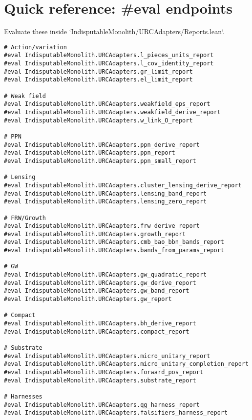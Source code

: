 \documentclass[11pt]{article}
\begin{document}
\section{Quick reference: \#eval endpoints}
Evaluate these inside `IndisputableMonolith/URCAdapters/Reports.lean`.
\begin{verbatim}
# Action/variation
#eval IndisputableMonolith.URCAdapters.l_pieces_units_report
#eval IndisputableMonolith.URCAdapters.l_cov_identity_report
#eval IndisputableMonolith.URCAdapters.gr_limit_report
#eval IndisputableMonolith.URCAdapters.el_limit_report

# Weak field
#eval IndisputableMonolith.URCAdapters.weakfield_eps_report
#eval IndisputableMonolith.URCAdapters.weakfield_derive_report
#eval IndisputableMonolith.URCAdapters.w_link_O_report

# PPN
#eval IndisputableMonolith.URCAdapters.ppn_derive_report
#eval IndisputableMonolith.URCAdapters.ppn_report
#eval IndisputableMonolith.URCAdapters.ppn_small_report

# Lensing
#eval IndisputableMonolith.URCAdapters.cluster_lensing_derive_report
#eval IndisputableMonolith.URCAdapters.lensing_band_report
#eval IndisputableMonolith.URCAdapters.lensing_zero_report

# FRW/Growth
#eval IndisputableMonolith.URCAdapters.frw_derive_report
#eval IndisputableMonolith.URCAdapters.growth_report
#eval IndisputableMonolith.URCAdapters.cmb_bao_bbn_bands_report
#eval IndisputableMonolith.URCAdapters.bands_from_params_report

# GW
#eval IndisputableMonolith.URCAdapters.gw_quadratic_report
#eval IndisputableMonolith.URCAdapters.gw_derive_report
#eval IndisputableMonolith.URCAdapters.gw_band_report
#eval IndisputableMonolith.URCAdapters.gw_report

# Compact
#eval IndisputableMonolith.URCAdapters.bh_derive_report
#eval IndisputableMonolith.URCAdapters.compact_report

# Substrate
#eval IndisputableMonolith.URCAdapters.micro_unitary_report
#eval IndisputableMonolith.URCAdapters.micro_unitary_completion_report
#eval IndisputableMonolith.URCAdapters.forward_pos_report
#eval IndisputableMonolith.URCAdapters.substrate_report

# Harnesses
#eval IndisputableMonolith.URCAdapters.qg_harness_report
#eval IndisputableMonolith.URCAdapters.falsifiers_harness_report
\end{verbatim}
\end{document}

